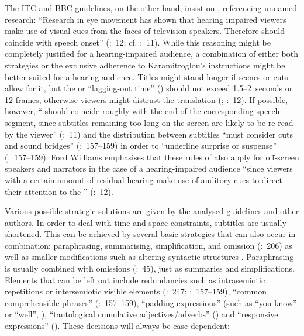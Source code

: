 The ITC and BBC guidelines, on the other hand, insist on , referencing unnamed  research: “Research in eye movement has shown that hearing impaired viewers make use of visual cues from the faces of television speakers. Therefore  should coincide with speech onset” (\citealt{Ford_williams2009}:~12; cf. \citealt{Itc1999}:~11). While this reasoning might be completely justified for a hearing-impaired audience, a combination of either both strategies or the exclusive adherence to Karamitroglou’s instructions might be better suited for a hearing audience. Titles might stand longer if scenes or cuts allow for it, but the  or “lagging-out time” (\citealt{Itc1999}) should not exceed 1.5--2~seconds or 12 frames, otherwise viewers might distrust the translation (\citealt{Itc1999}; \citealt{Ford_williams2009}:~12). If possible, however, “ should coincide roughly with the end of the corresponding speech segment, since subtitles remaining too long on the screen are likely to be re-read by the viewer” (\citealt{Itc1999}:~11) and the distribution between subtitles “must consider cuts and sound bridges” (\citealt{Ivarsson1998}:~157--159) in order to “underline surprise or suspense” (\citealt{Ivarsson1998}:~157--159). Ford Williams emphasises that these rules of  also apply for off-screen speakers and narrators in the case of a hearing-impaired audience “since viewers with a certain amount of residual hearing make use of auditory cues to direct their attention to the ” (\citeyear{Ford_williams2009}:~12).

Various possible strategic solutions are given by the analysed guidelines and other authors. In order to deal with time and space constraints,  subtitles are usually shortened. This can be achieved by several basic strategies that can also occur in combination: paraphrasing, summarising, simplification, and omission (\citealt{Diaz_cintas2007b}:~206) as well as smaller modifications such as altering syntactic structures \citep{Karamitroglou1998}. Paraphrasing is usually combined with omissions (\citealt{Leisner2009}:~45), just as summaries and simplifications. Elements that can be left out include redundancies such as intrasemiotic repetitions or intersemiotic visible elements (\citealt{Gottlieb1998}:~247; \citealt{Ivarsson1998}:~157--159), “common comprehensible phrases” (\citealt{Ivarsson1998}:~157--159), “padding expressions” (such as “you know” or “well”, \citealt{Karamitroglou1998}), “tautological cumulative adjectives/adverbs” (\citealt{Karamitroglou1998}) and “responsive expressions” (\citealt{Karamitroglou1998}). These decisions will always be case-dependent:


